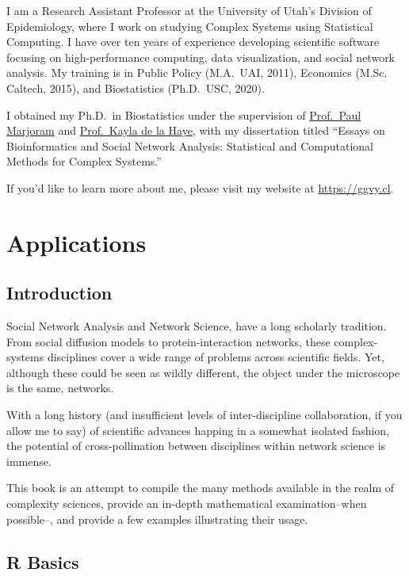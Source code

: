 \documentclass[]{book}
\begin{document}
I am a Research Assistant Professor at the University of Utah's Division of
Epidemiology, where I work on studying Complex Systems using Statistical Computing.
I have over ten years of experience developing scientific software focusing on
high-performance computing, data visualization, and social network analysis.
My training is in Public Policy (M.A.~UAI, 2011), Economics (M.Sc. Caltech,
2015), and Biostatistics (Ph.D.~USC, 2020).

I obtained my Ph.D.~in Biostatistics under the supervision of
\href{https://scholar.google.com/citations?user=Zj5ky5gAAAAJ\&hl=en}{Prof.~Paul Marjoram} and
\href{https://kayladelahaye.net/}{Prof.~Kayla de la Haye}, with my dissertation titled ``Essays on
Bioinformatics and Social Network Analysis: Statistical and Computational Methods
for Complex Systems.''

If you'd like to learn more about me, please visit my website at \url{https://ggvy.cl}.

\hypertarget{part-applications}{%
\part{Applications}\label{part-applications}}

\hypertarget{introduction}{%
\chapter{Introduction}\label{introduction}}

Social Network Analysis and Network Science, have a long scholarly tradition.
From social diffusion models to protein-interaction networks, these complex-systems
disciplines cover a wide range of problems across scientific fields. Yet, although
these could be seen as wildly different, the object under the microscope is the
same, networks.

With a long history (and insufficient levels of inter-discipline collaboration,
if you allow me to say) of scientific advances happing in a somewhat isolated
fashion, the potential of cross-pollination between disciplines within network
science is immense.

This book is an attempt to compile the many methods available in the realm of
complexity sciences, provide an in-depth mathematical examination--when possible--,
and provide a few examples illustrating their usage.

\hypertarget{r-basics}{%
\chapter{R Basics}\label{r-basics}}
\end{document}
